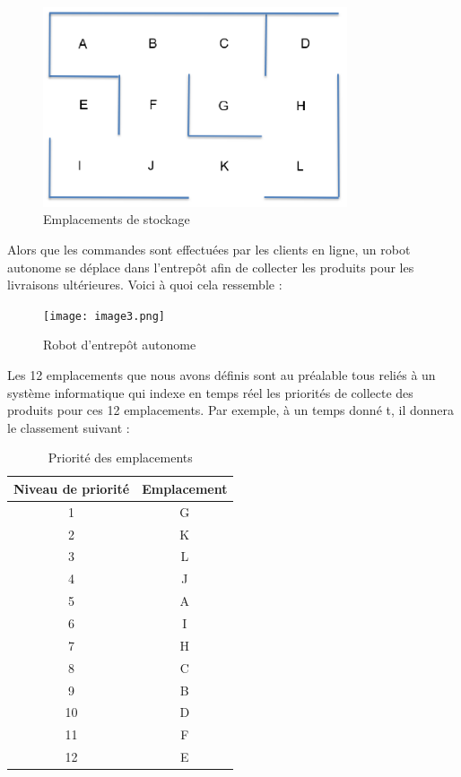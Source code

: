 \documentclass{article}
\begin{document}
\begin{figure}[h]
    \centering
    \includegraphics[width=0.8\textwidth]{image2.png} 
    \caption{Emplacements de stockage}
    \label{fig:Emplacements de stockage}
\end{figure}
Alors que les commandes sont effectuées par les clients en ligne, un robot autonome se déplace dans l'entrepôt afin de collecter les produits pour les livraisons ultérieures. Voici à quoi cela ressemble :
\begin{figure}[h]
    \centering
    \texttt{[image: image3.png]} 
    \caption{Robot d'entrepôt autonome}
    \label{fig:Robot d'entrepôt autonome}
\end{figure}

Les 12 emplacements que nous avons définis sont au préalable tous reliés à un système informatique qui indexe en temps réel les priorités de collecte des produits pour ces 12 emplacements. Par exemple, à un temps donné t, il donnera le classement suivant :

\begin{table}[H]
    \centering
    \begin{tabular}{|c|c|}
        \hline
        Niveau de priorité & Emplacement \\
        \hline
        1 & G \\
        2 & K \\
        3 & L \\
        4 & J \\
        5 & A \\
        6 & I \\
        7 & H \\
        8 & C \\
        9 & B \\
        10 & D \\
        11 & F \\
        12 & E \\
        \hline
    \end{tabular}
    \caption{Priorité des emplacements}
\end{table}
\end{document}
